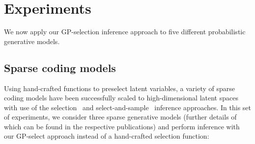 \section{Experiments}
\label{exps}
%
We now apply our GP-selection inference approach to five different probabilistic generative models.

\subsection{Sparse coding models}
Using hand-crafted functions to preselect latent variables, a variety of sparse coding models have been successfully scaled to high-dimensional  latent spaces with use of the selection~\citep{HennigesEtAl2010, BornscheinEtAl2013, SheikhEtAl2014} and select-and-sample~\citep{SheltonEtAl2011, SheltonEtAl2012} inference approaches.
In this set of experiments, we consider three sparse generative models (further details of which can be found in the respective publications) and perform inference with our GP-select approach instead of a hand-crafted selection function:
%

